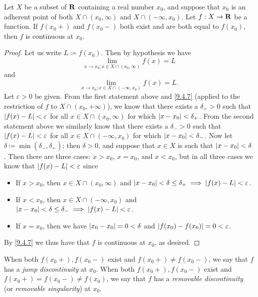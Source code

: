 \setcounter{theorem}{2}
\begin{proposition}\label{9.5.3}
  Let \(X\) be a subset of \(\mathbf{R}\) containing a real number \(x_0\), and suppose that \(x_0\) is an adherent point of both \(X \cap (x_0, \infty)\) and \(X \cap (-\infty, x_0)\).
  Let \(f : X \to \mathbf{R}\) be a function.
  If \(f(x_0+)\) and \(f(x_0-)\) both exist and are both equal to \(f(x_0)\), then \(f\) is continuous at \(x_0\).
\end{proposition}

\begin{proof}
  Let us write \(L \coloneqq f(x_0)\).
  Then by hypothesis we have
  \[
    \lim_{x \to x_0 ; x \in X \cap (x_0, \infty)} f(x) = L
  \]
  and
  \[
    \lim_{x \to x_0 ; x \in X \cap (-\infty, x_0)} f(x) = L.
  \]
  Let \(\varepsilon > 0\) be given.
  From the first statement above and \cref{9.4.7} (applied to the restriction of \(f\) to \(X \cap (x_0, +\infty)\)), we know that there exists a \(\delta_+ > 0\) such that \(\left\lvert f(x) - L\right\rvert < \varepsilon\) for all \(x \in X \cap(x_0, \infty)\) for which \(\left\lvert x - x_0\right\rvert < \delta_+\).
  From the second statement above we similarly know that there exists a \(\delta_- > 0\) such that \(\left\lvert f(x) - L\right\rvert < \varepsilon\) for all \(x \in X \cap (-\infty, x_0)\) for which \(\left\lvert x - x_0\right\rvert < \delta_-\).
  Now let \(\delta \coloneqq \min(\delta_-, \delta_+)\);
  then \(\delta > 0\), and suppose that \(x \in X\) is such that \(\left\lvert x - x_0\right\rvert < \delta\).
  Then there are three cases:
  \(x > x_0\), \(x = x_0\), and \(x < x_0\), but in all three cases we know that \(\left\lvert f(x) - L\right\rvert < \varepsilon\) since
  \begin{itemize}
    \item If \(x > x_0\), then \(x \in X \cap (x_0, \infty)\) and \(\left\lvert x - x_0\right\rvert < \delta \leq \delta_+ \implies \left\lvert f(x) - L\right\rvert < \varepsilon\).
    \item If \(x < x_0\), then \(x \in X \cap (-\infty, x_0)\) and \(\left\lvert x - x_0\right\rvert < \delta \leq \delta_- \implies \left\lvert f(x) - L\right\rvert < \varepsilon\).
    \item If \(x = x_0\), then we have \(\left\lvert x_0 - x_0\right\rvert = 0 < \delta\) and \(\left\lvert f(x_0) - f(x_0)\right\rvert = 0 < \varepsilon\).
  \end{itemize}
  By \cref{9.4.7} we thus have that \(f\) is continuous at \(x_0\), as desired.
\end{proof}

\begin{note}
  When both \(f(x_0+), f(x_0-)\) exist and \(f(x_0+) \neq f(x_0-)\), we say that \(f\) has a \emph{jump discontinuity} at \(x_0\).
  When both \(f(x_0+), f(x_0-)\) exist and \(f(x_0+) = f(x_0-) \neq f(x_0)\), we say that \(f\) has a \emph{removable discontinuity} (or \emph{removable singularity}) at \(x_0\).
\end{note}

